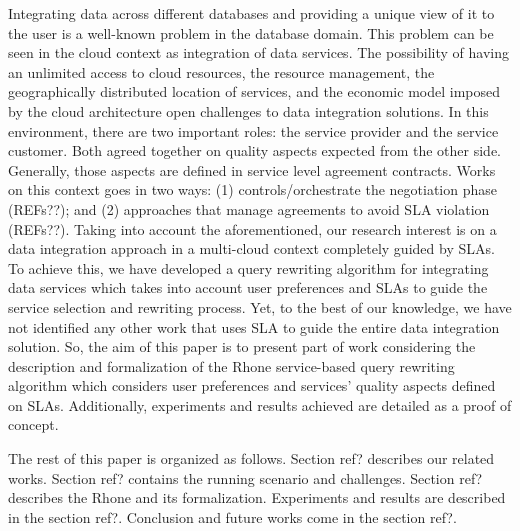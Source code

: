 Integrating data across different databases and providing a unique view of it to the user is a well-known problem in the database domain.
This problem can be seen in the cloud context as integration of data services.
The possibility of having an unlimited access to cloud resources, the resource management, the geographically distributed location of services, and the economic model imposed by the cloud architecture open challenges to data integration solutions.
In this environment, there are two important roles: the service provider
and the service customer. Both agreed together on quality aspects expected
from the other side. Generally, those aspects are defined in service level 
agreement contracts. Works on this context goes in two ways: (1) controls/orchestrate
the negotiation phase (REFs??); and (2) approaches that manage agreements to avoid SLA violation (REFs??).
Taking into account the aforementioned, our research interest is on a data integration approach in a 
multi-cloud context completely guided by SLAs. To achieve this, we have developed a query rewriting 
algorithm for integrating data services which takes into account user preferences and SLAs to guide the
service selection and rewriting process. Yet, to the best of our knowledge, we have not identified any other
work that uses SLA to guide the entire data integration solution. So, the aim of this paper is to present part of work considering the description and formalization of the Rhone service-based query rewriting algorithm which considers user preferences and services' quality aspects defined on SLAs. Additionally, experiments and results achieved are detailed as a proof of concept.

The rest of this paper is organized as follows. 
Section ref? describes our related works. 
Section ref? contains the running scenario and challenges.
Section ref? describes the Rhone and its formalization. 
Experiments and results are described in the section ref?. 
Conclusion and future works come in the section ref?.